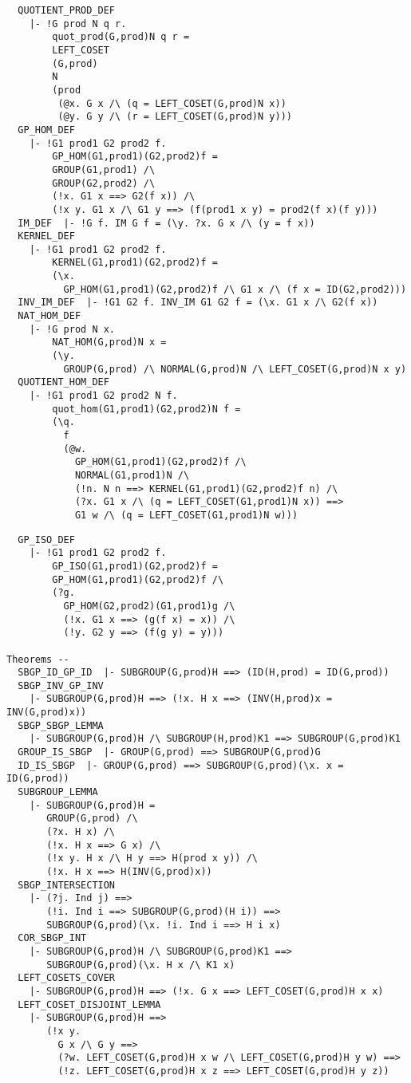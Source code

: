 \newpage
\begin{verbatim}
  QUOTIENT_PROD_DEF
    |- !G prod N q r.
        quot_prod(G,prod)N q r =
        LEFT_COSET
        (G,prod)
        N
        (prod
         (@x. G x /\ (q = LEFT_COSET(G,prod)N x))
         (@y. G y /\ (r = LEFT_COSET(G,prod)N y)))
  GP_HOM_DEF
    |- !G1 prod1 G2 prod2 f.
        GP_HOM(G1,prod1)(G2,prod2)f =
        GROUP(G1,prod1) /\
        GROUP(G2,prod2) /\
        (!x. G1 x ==> G2(f x)) /\
        (!x y. G1 x /\ G1 y ==> (f(prod1 x y) = prod2(f x)(f y)))
  IM_DEF  |- !G f. IM G f = (\y. ?x. G x /\ (y = f x))
  KERNEL_DEF
    |- !G1 prod1 G2 prod2 f.
        KERNEL(G1,prod1)(G2,prod2)f =
        (\x.
          GP_HOM(G1,prod1)(G2,prod2)f /\ G1 x /\ (f x = ID(G2,prod2)))
  INV_IM_DEF  |- !G1 G2 f. INV_IM G1 G2 f = (\x. G1 x /\ G2(f x))
  NAT_HOM_DEF
    |- !G prod N x.
        NAT_HOM(G,prod)N x =
        (\y.
          GROUP(G,prod) /\ NORMAL(G,prod)N /\ LEFT_COSET(G,prod)N x y)
  QUOTIENT_HOM_DEF
    |- !G1 prod1 G2 prod2 N f.
        quot_hom(G1,prod1)(G2,prod2)N f =
        (\q.
          f
          (@w.
            GP_HOM(G1,prod1)(G2,prod2)f /\
            NORMAL(G1,prod1)N /\
            (!n. N n ==> KERNEL(G1,prod1)(G2,prod2)f n) /\
            (?x. G1 x /\ (q = LEFT_COSET(G1,prod1)N x)) ==>
            G1 w /\ (q = LEFT_COSET(G1,prod1)N w)))
\end{verbatim}
\newpage
\begin{verbatim}
  GP_ISO_DEF
    |- !G1 prod1 G2 prod2 f.
        GP_ISO(G1,prod1)(G2,prod2)f =
        GP_HOM(G1,prod1)(G2,prod2)f /\
        (?g.
          GP_HOM(G2,prod2)(G1,prod1)g /\
          (!x. G1 x ==> (g(f x) = x)) /\
          (!y. G2 y ==> (f(g y) = y)))

Theorems --
  SBGP_ID_GP_ID  |- SUBGROUP(G,prod)H ==> (ID(H,prod) = ID(G,prod))
  SBGP_INV_GP_INV
    |- SUBGROUP(G,prod)H ==> (!x. H x ==> (INV(H,prod)x = INV(G,prod)x))
  SBGP_SBGP_LEMMA
    |- SUBGROUP(G,prod)H /\ SUBGROUP(H,prod)K1 ==> SUBGROUP(G,prod)K1
  GROUP_IS_SBGP  |- GROUP(G,prod) ==> SUBGROUP(G,prod)G
  ID_IS_SBGP  |- GROUP(G,prod) ==> SUBGROUP(G,prod)(\x. x = ID(G,prod))
  SUBGROUP_LEMMA
    |- SUBGROUP(G,prod)H =
       GROUP(G,prod) /\
       (?x. H x) /\
       (!x. H x ==> G x) /\
       (!x y. H x /\ H y ==> H(prod x y)) /\
       (!x. H x ==> H(INV(G,prod)x))
  SBGP_INTERSECTION
    |- (?j. Ind j) ==>
       (!i. Ind i ==> SUBGROUP(G,prod)(H i)) ==>
       SUBGROUP(G,prod)(\x. !i. Ind i ==> H i x)
  COR_SBGP_INT
    |- SUBGROUP(G,prod)H /\ SUBGROUP(G,prod)K1 ==>
       SUBGROUP(G,prod)(\x. H x /\ K1 x)
  LEFT_COSETS_COVER
    |- SUBGROUP(G,prod)H ==> (!x. G x ==> LEFT_COSET(G,prod)H x x)
  LEFT_COSET_DISJOINT_LEMMA
    |- SUBGROUP(G,prod)H ==>
       (!x y.
         G x /\ G y ==>
         (?w. LEFT_COSET(G,prod)H x w /\ LEFT_COSET(G,prod)H y w) ==>
         (!z. LEFT_COSET(G,prod)H x z ==> LEFT_COSET(G,prod)H y z))
\end{verbatim}
